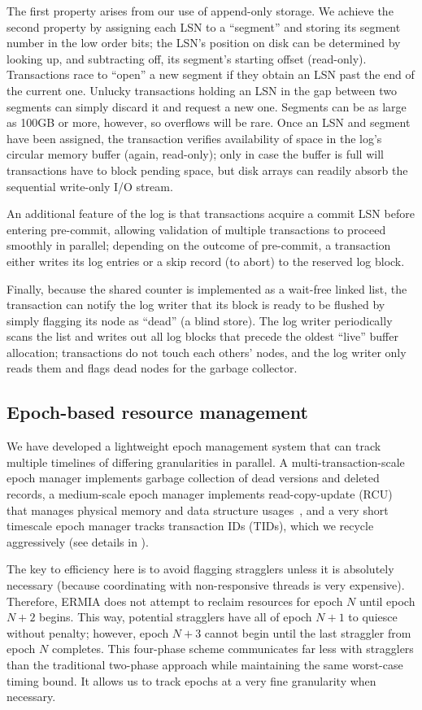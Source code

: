 The first property arises from our use of append-only storage. We achieve the second property by assigning each LSN to a ``segment'' and storing its segment number in the low order bits; the LSN's position on disk can be determined by looking up, and subtracting off, its segment's starting offset (read-only). Transactions race to ``open'' a new segment if they obtain an LSN past the end of the current one. Unlucky transactions holding an LSN in the gap between two segments can simply discard it and request a new one. Segments can be as large as 100GB or more, however, so overflows will be rare. Once an LSN and segment have been assigned, the transaction verifies availability of space in the log's circular memory buffer (again, read-only); only in case the buffer is full will transactions have to block pending space, but disk arrays can readily absorb the sequential write-only I/O stream.

An additional feature of the log is that transactions acquire a commit LSN before entering pre-commit, allowing validation of multiple transactions to proceed smoothly in parallel; depending on the outcome of pre-commit, a transaction either writes its log entries or a skip record (to abort) to the reserved log block.

Finally, because the shared counter is implemented as a wait-free linked list, the transaction can notify the log writer that its block is ready to be flushed by simply flagging its node as ``dead'' (a blind store). The log writer periodically scans the list and writes out all log blocks that precede the oldest ``live'' buffer allocation; transactions do not touch each others' nodes, and the log writer only reads them and flags dead nodes for the garbage collector.

\subsection{Epoch-based resource management}
 We have developed a lightweight epoch management system that can track multiple timelines of differing granularities in parallel. A multi-transaction-scale epoch manager implements garbage collection of dead versions and deleted records, a medium-scale epoch manager implements read-copy-update (RCU) that manages physical memory and data structure usages~\cite{McKenneyS98}, and a very short timescale epoch manager tracks transaction IDs (TIDs), which we recycle aggressively (see details in ).

The key to efficiency here is to avoid flagging stragglers unless it is absolutely necessary (because coordinating with non-responsive threads is very expensive). Therefore, ERMIA does not attempt to reclaim resources for epoch $N$ until epoch $N+2$ begins. This way, potential stragglers have all of epoch $N+1$ to quiesce without penalty; however, epoch $N+3$ cannot begin until the last straggler from epoch $N$ completes. This four-phase scheme communicates far less with stragglers than the traditional two-phase  approach while maintaining the same worst-case timing bound. It allows us to track epochs at a very fine granularity when necessary. 


